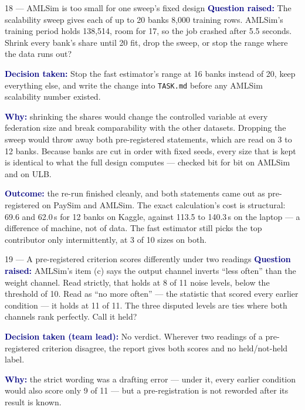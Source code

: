 \documentclass[11pt]{article}
\newcommand{\qlabel}[1]{\textbf{\textcolor{navy}{#1}}\;}
\begin{document}
\begin{decision}{18 --- AMLSim is too small for one sweep's fixed design}
\qlabel{Question raised:} The scalability sweep gives each of up to 20 banks 8{,}000 training rows.
AMLSim's training period holds 138{,}514, room for 17, so the job crashed after 5.5 seconds. Shrink every
bank's share until 20 fit, drop the sweep, or stop the range where the data runs out?

\qlabel{Decision taken:} Stop the fast estimator's range at 16 banks instead of 20, keep everything else,
and write the change into \texttt{TASK.md} before any AMLSim scalability number existed.

\qlabel{Why:} shrinking the shares would change the controlled variable at every federation size and break
comparability with the other datasets. Dropping the sweep would throw away both pre-registered statements,
which are read on 3 to 12 banks. Because banks are cut in order with fixed seeds, every size that is kept
is identical to what the full design computes --- checked bit for bit on AMLSim and on ULB.

\qlabel{Outcome:} the re-run finished cleanly, and both statements came out as pre-registered on PaySim
and AMLSim. The exact calculation's cost is structural: 69.6 and 62.0\,s for 12 banks on Kaggle, against
113.5 to 140.3\,s on the laptop --- a difference of machine, not of data. The fast estimator still picks the
top contributor only intermittently, at 3 of 10 sizes on both.
\end{decision}

\begin{decision}{19 --- A pre-registered criterion scores differently under two readings}
\qlabel{Question raised:} AMLSim's item (c) says the output channel inverts ``less often'' than the
weight channel. Read strictly, that holds at 8 of 11 noise levels, below the threshold of 10. Read as ``no
more often'' --- the statistic that scored every earlier condition --- it holds at 11 of 11. The three
disputed levels are ties where both channels rank perfectly. Call it held?

\qlabel{Decision taken (team lead):} No verdict. Wherever two readings of a pre-registered criterion
disagree, the report gives both scores and no held/not-held label.

\qlabel{Why:} the strict wording was a drafting error --- under it, every earlier condition would also
score only 9 of 11 --- but a pre-registration is not reworded after its result is known.
\end{decision}
\end{document}

